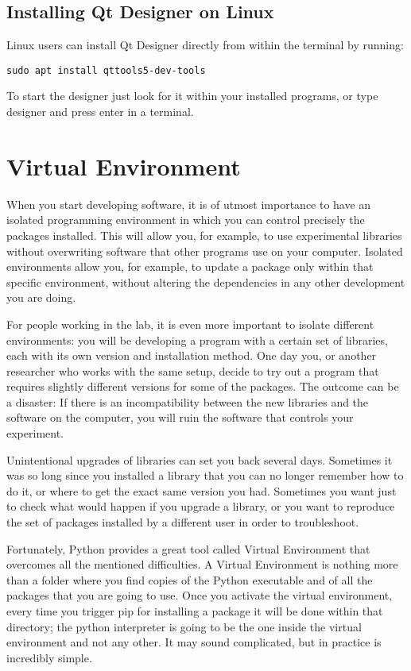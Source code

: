 \subsection{Installing Qt Designer on Linux}

Linux users can install Qt Designer directly from within the terminal by running:

\begin{verbatim}
sudo apt install qttools5-dev-tools
\end{verbatim}

To start the designer just look for it within your installed programs, or type designer and press enter in a terminal.

\section{Virtual Environment}
When you start developing software, it is of utmost importance to have an isolated programming environment in which you can control precisely the packages installed. This will allow you, for example, to use experimental libraries without overwriting software that other programs use on your computer. Isolated environments allow you, for example, to update a package only within that specific environment, without altering the dependencies in any other development you are doing.

For people working in the lab, it is even more important to isolate different environments: you will be developing a program with a certain set of libraries, each with its own version and installation method. One day you, or another researcher who works with the same setup, decide to try out a program that requires slightly different versions for some of the packages. The outcome can be a disaster: If there is an incompatibility between the new libraries and the software on the computer, you will ruin the software that controls your experiment.

Unintentional upgrades of libraries can set you back several days. Sometimes it was so long since you installed a library that you can no longer remember how to do it, or where to get the exact same version you had. Sometimes you want just to check what would happen if you upgrade a library, or you want to reproduce the set of packages installed by a different user in order to troubleshoot.

Fortunately, Python provides a great tool called Virtual Environment that overcomes all the mentioned difficulties. A Virtual Environment is nothing more than a folder where you find copies of the Python executable and of all the packages that you are going to use. Once you activate the virtual environment, every time you trigger pip for installing a package it will be done within that directory; the python interpreter is going to be the one inside the virtual environment and not any other. It may sound complicated, but in practice is incredibly simple.

